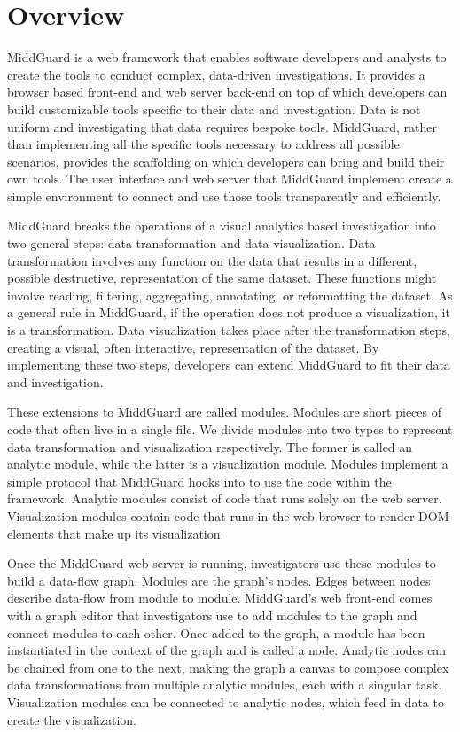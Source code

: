 \documentclass[midd]{thesis}
\begin{document}
\section{Overview}

MiddGuard is a web framework that enables software developers and analysts to
create the tools to conduct complex, data-driven investigations. It provides a
browser based front-end and web server back-end on top of which developers can
build customizable tools specific to their data and investigation. Data is not
uniform and investigating that data requires bespoke tools. MiddGuard,
rather than implementing all the specific tools necessary to address all
possible scenarios, provides the scaffolding on which developers can bring and
build their own tools. The user interface and web server that MiddGuard
implement create a simple environment to connect and use those tools
transparently and efficiently.

MiddGuard breaks the operations of a visual analytics based investigation into
two general steps: data transformation and data visualization. Data
transformation involves any function on the data that results in a different,
possible destructive, representation of the same dataset. These functions might
involve reading, filtering, aggregating, annotating, or reformatting the
dataset. As a general rule in MiddGuard, if the operation does not produce a
visualization, it is a transformation. Data visualization takes place after the
transformation steps, creating a visual, often interactive, representation of
the dataset. By implementing these two steps, developers can extend MiddGuard to
fit their data and investigation.

These extensions to MiddGuard are called modules. Modules are short pieces of
code that often live in a single file. We divide modules into two types to
represent data transformation and visualization respectively. The former is
called an analytic module, while the latter is a visualization module. Modules
implement a simple protocol that MiddGuard hooks into to use the code within the
framework. Analytic modules consist of code that runs solely on the web server.
Visualization modules contain code that runs in the web browser to render DOM
elements that make up its visualization.

Once the MiddGuard web server is running, investigators use these modules to
build a data-flow graph. Modules are the graph's nodes. Edges between nodes
describe data-flow from module to module. MiddGuard's web front-end comes with a
graph editor that investigators use to add modules to the graph and connect
modules to each other. Once added to the graph, a module has been instantiated
in the context of the graph and is called a node. Analytic nodes can be chained
from one to the next, making the graph a canvas to compose complex data
transformations from multiple analytic modules, each with a singular task.
Visualization modules can be connected to analytic nodes, which feed in data to
create the visualization.
\end{document}

